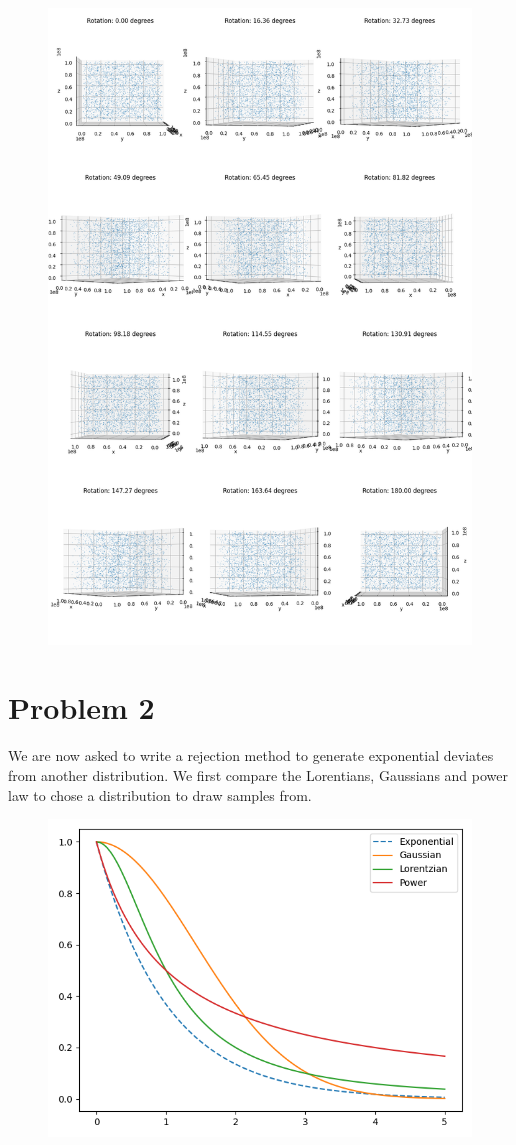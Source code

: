 \documentclass[]{article}
\begin{document}
\begin{figure}[bp!]
	\centering
	\includegraphics[width=\linewidth]{Results/q1b.png}
\end{figure}

\newpage
\section{Problem 2}
We are now asked to write a rejection method to generate exponential
deviates from another distribution. We first compare the Lorentians, Gaussians and power law to chose a distribution to draw samples from.

\begin{figure}[h!]
	\centering
	\includegraphics[width=0.5\linewidth]{Results/q2a.png}
\end{figure}
\end{document}
